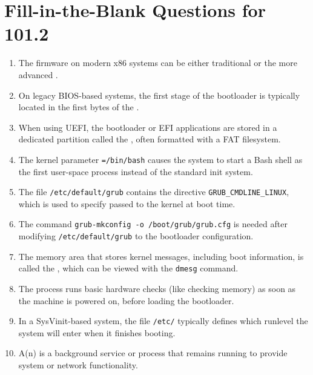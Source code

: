 \documentclass[12pt,a4paper]{report}
\begin{document}
  
  \section*{Fill-in-the-Blank Questions for 101.2}
  
  \begin{enumerate}[1.]
    \item The firmware on modern x86 systems can be either traditional \underline{\hspace{2cm}} or the more advanced \underline{\hspace{2cm}}.
    \item On legacy BIOS-based systems, the first stage of the bootloader is typically located in the first \underline{\hspace{2cm}} bytes of the \underline{\hspace{2cm}}.
    \item When using UEFI, the bootloader or EFI applications are stored in a dedicated partition called the \underline{\hspace{2cm}}, often formatted with a FAT filesystem.
    \item The kernel parameter \texttt{\underline{\hspace{2cm}}=/bin/bash} causes the system to start a Bash shell as the first user-space process instead of the standard init system.
    \item The file \texttt{/etc/default/grub} contains the directive \texttt{GRUB\_CMDLINE\_LINUX}, which is used to specify \underline{\hspace{2cm}} passed to the kernel at boot time.
    \item The command \texttt{grub-mkconfig -o /boot/grub/grub.cfg} is needed after modifying \texttt{/etc/default/grub} to \underline{\hspace{2cm}} the bootloader configuration.
    \item The memory area that stores kernel messages, including boot information, is called the \underline{\hspace{2cm}}, which can be viewed with the \texttt{dmesg} command.
    \item The \underline{\hspace{2cm}} process runs basic hardware checks (like checking memory) as soon as the machine is powered on, before loading the bootloader.
    \item In a SysVinit-based system, the file \texttt{/etc/\underline{\hspace{2cm}}} typically defines which runlevel the system will enter when it finishes booting.
    \item A(n) \underline{\hspace{2cm}} is a background service or process that remains running to provide system or network functionality.
\end{enumerate}
\newpage
\end{document}
